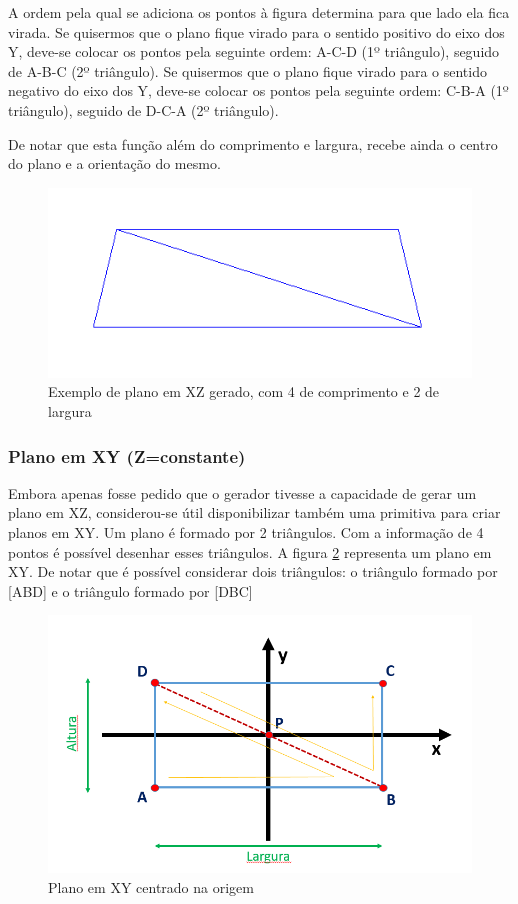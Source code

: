 A ordem pela qual se adiciona os pontos à figura determina para que lado ela fica virada. Se quisermos que o plano fique virado para o sentido positivo do eixo dos Y, deve-se colocar os pontos pela seguinte ordem: A-C-D (1º triângulo), seguido de A-B-C (2º triângulo). Se quisermos que o plano fique virado para o sentido negativo do eixo dos Y, deve-se colocar os pontos pela seguinte ordem: C-B-A (1º triângulo), seguido de D-C-A (2º triângulo).



De notar que esta função além do comprimento e largura, recebe ainda o centro do plano e a orientação do mesmo.

\begin{figure}[<+htpb+>]
	\centering
	\includegraphics[scale=0.5]{imagens/p3_plano_4_2.png}
	\caption{Exemplo de plano em XZ gerado, com 4 de comprimento e 2 de largura}
	\label{p1:fig:p3_plano_4_2}
\end{figure}

\subsubsection{Plano em XY (Z=constante)}

Embora apenas fosse pedido que o gerador tivesse a capacidade de gerar um plano em XZ, considerou-se útil disponibilizar também uma primitiva para criar planos em XY.
Um plano é formado por 2 triângulos. Com a informação de 4 pontos é possível desenhar esses triângulos. A figura \ref{p1:fig:p3_planoY} representa um plano em XY. De notar que é possível considerar dois triângulos: o triângulo formado por [ABD] e o triângulo formado por [DBC]

\begin{figure}[<+htpb+>]
	\centering
	\includegraphics[scale=0.5]{imagens/p3_planoY.png}
	\caption{Plano em XY centrado na origem}
	\label{p1:fig:p3_planoY}
\end{figure}

